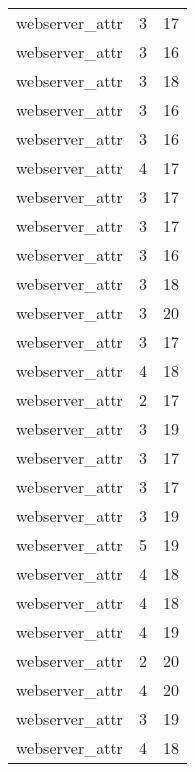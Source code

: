 \begin{table}
\begin{tabular}{lrr}
                  webserver\_attr &         3 &        17 \\
                  webserver\_attr &         3 &        16 \\
                  webserver\_attr &         3 &        18 \\
                  webserver\_attr &         3 &        16 \\
                  webserver\_attr &         3 &        16 \\
                  webserver\_attr &         4 &        17 \\
                  webserver\_attr &         3 &        17 \\
                  webserver\_attr &         3 &        17 \\
                  webserver\_attr &         3 &        16 \\
                  webserver\_attr &         3 &        18 \\
                  webserver\_attr &         3 &        20 \\
                  webserver\_attr &         3 &        17 \\
                  webserver\_attr &         4 &        18 \\
                  webserver\_attr &         2 &        17 \\
                  webserver\_attr &         3 &        19 \\
                  webserver\_attr &         3 &        17 \\
                  webserver\_attr &         3 &        17 \\
                  webserver\_attr &         3 &        19 \\
                  webserver\_attr &         5 &        19 \\
                  webserver\_attr &         4 &        18 \\
                  webserver\_attr &         4 &        18 \\
                  webserver\_attr &         4 &        19 \\
                  webserver\_attr &         2 &        20 \\
                  webserver\_attr &         4 &        20 \\
                  webserver\_attr &         3 &        19 \\
                  webserver\_attr &         4 &        18 \\

\end{tabular}
\end{table}

